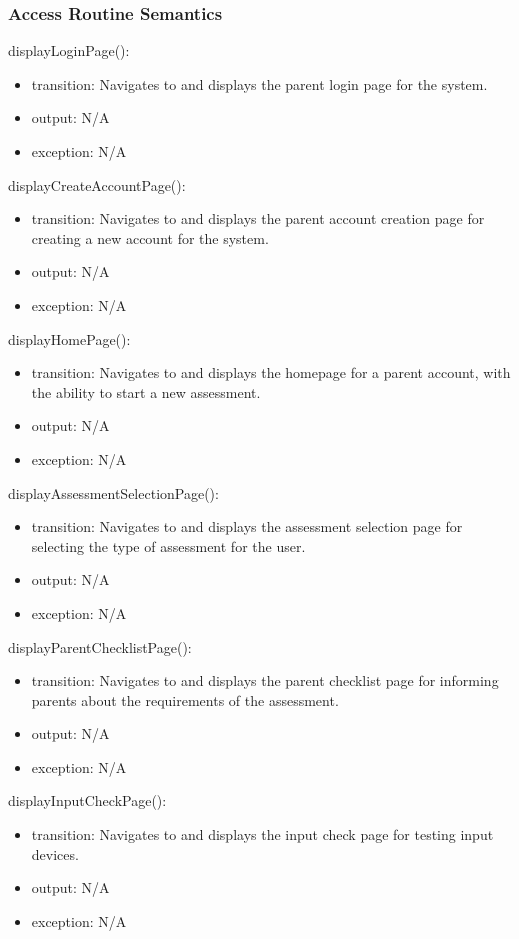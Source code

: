 \documentclass[12pt, titlepage]{article}
\begin{document}
\subsubsection{Access Routine Semantics}

\noindent displayLoginPage():
\begin{itemize}
\item transition: Navigates to and displays the parent login page for the system.
\item output: N/A
\item exception: N/A
\end{itemize}

\noindent displayCreateAccountPage():
\begin{itemize}
\item transition: Navigates to and displays the parent account creation page for creating a new account for the system.
\item output: N/A
\item exception: N/A
\end{itemize}

\noindent displayHomePage():
\begin{itemize}
\item transition: Navigates to and displays the homepage for a parent account, with the ability to start a new assessment.
\item output: N/A
\item exception: N/A
\end{itemize}

\noindent displayAssessmentSelectionPage():
\begin{itemize}
\item transition: Navigates to and displays the assessment selection page for selecting the type of assessment for the user.
\item output: N/A
\item exception: N/A
\end{itemize}

\noindent displayParentChecklistPage():
\begin{itemize}
\item transition: Navigates to and displays the parent checklist page for informing parents about the requirements of the assessment.
\item output: N/A
\item exception: N/A
\end{itemize}

\noindent displayInputCheckPage():
\begin{itemize}
\item transition: Navigates to and displays the input check page for testing input devices.
\item output: N/A
\item exception: N/A
\end{itemize}
\end{document}
